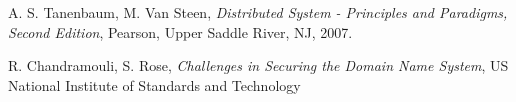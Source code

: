 \documentclass[a4paper,10pt]{report}
\begin{document}











\begin{thebibliography}{9}

	A. S. Tanenbaum, M. Van Steen, \emph{Distributed System - Principles and Paradigms, Second Edition}, Pearson, Upper Saddle River, NJ, 2007.

	 R. Chandramouli, S. Rose, \emph{Challenges in Securing the Domain Name System},  US National Institute of Standards and Technology
\end{thebibliography}
\end{document}

